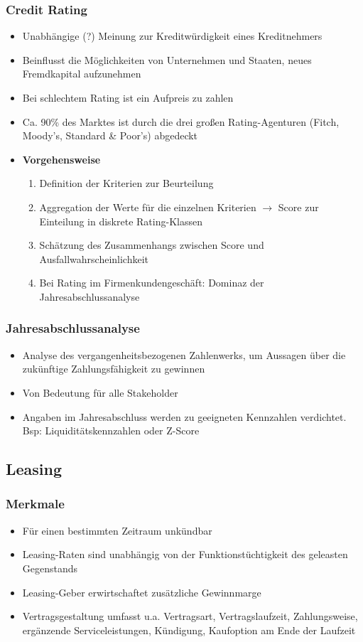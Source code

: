 \subsubsection{Credit Rating}
\begin{itemize}
	\item Unabhängige (?) Meinung zur Kreditwürdigkeit eines Kreditnehmers
	\item Beinflusst die Möglichkeiten von Unternehmen und Staaten, neues Fremdkapital aufzunehmen
	\item Bei schlechtem Rating ist ein Aufpreis zu zahlen
	\item Ca. 90\% des Marktes ist durch die drei großen Rating-Agenturen (Fitch, Moody's, Standard \& Poor's) abgedeckt
	\item \textbf{Vorgehensweise}
	\begin{enumerate}
		\item Definition der Kriterien zur Beurteilung
		\item Aggregation der Werte für die einzelnen Kriterien $\rightarrow$ Score zur Einteilung in diskrete Rating-Klassen
		\item Schätzung des Zusammenhangs zwischen Score und Ausfallwahrscheinlichkeit
		\item Bei Rating im Firmenkundengeschäft: Dominaz der Jahresabschlussanalyse
	\end{enumerate}
\end{itemize}

\subsubsection{Jahresabschlussanalyse}
\begin{itemize}
	\item Analyse des vergangenheitsbezogenen Zahlenwerks, um Aussagen über die zukünftige Zahlungsfähigkeit zu gewinnen
	\item Von Bedeutung für alle Stakeholder
	\item Angaben im Jahresabschluss werden zu geeigneten Kennzahlen verdichtet. Bsp: Liquiditätskennzahlen oder Z-Score
\end{itemize}


\subsection{Leasing}

\subsubsection{Merkmale}
\begin{itemize}
	\item Für einen bestimmten Zeitraum unkündbar
	\item Leasing-Raten sind unabhängig von der Funktionstüchtigkeit des geleasten Gegenstands
	\item Leasing-Geber erwirtschaftet zusätzliche Gewinnmarge
	\item Vertragsgestaltung umfasst u.a. Vertragsart, Vertragslaufzeit, Zahlungsweise, ergänzende Serviceleistungen, Kündigung, Kaufoption am Ende der Laufzeit
\end{itemize}

